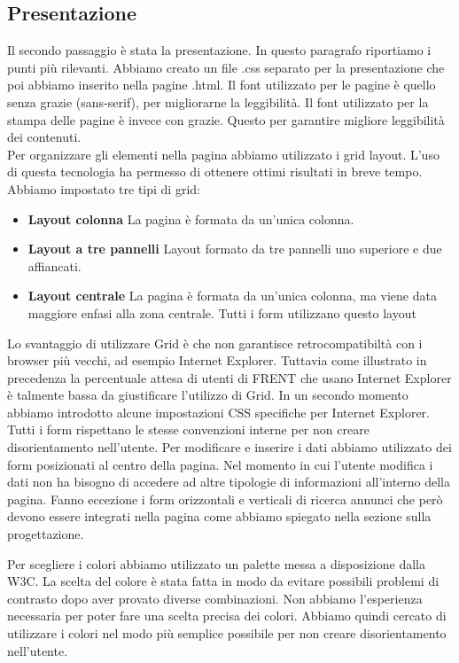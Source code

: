 \documentclass[1_relazione.tex]{subfiles}
\begin{document}
\subsection{Presentazione}
Il secondo passaggio \`{e} stata la presentazione. In questo paragrafo riportiamo i punti pi\`{u} rilevanti. Abbiamo creato un file .css separato per la presentazione che poi abbiamo inserito nella pagine .html. Il font utilizzato per le pagine \`{e} quello senza grazie (sans-serif), per migliorarne la leggibilit\`{a}. Il font utilizzato per la stampa delle pagine \`{e} invece con grazie. Questo per garantire migliore leggibilit\`{a} dei contenuti.  \\
Per organizzare gli elementi nella pagina abbiamo utilizzato i grid layout. L'uso di questa tecnologia ha permesso di ottenere ottimi risultati in breve tempo. Abbiamo impostato tre tipi di grid:
\begin{itemize}
\item \textbf{Layout colonna} La pagina è formata da un'unica colonna.
\item \textbf{Layout a tre pannelli} Layout formato da tre pannelli uno superiore e due affiancati.
\item \textbf{Layout centrale} La pagina è formata da un'unica colonna, ma viene data maggiore enfasi alla zona centrale. Tutti i form utilizzano questo layout
\end{itemize}

Lo svantaggio di utilizzare Grid \`{e} che non garantisce retrocompatibilt\`{a} con i browser pi\`{u} vecchi, ad esempio Internet Explorer. Tuttavia come illustrato in precedenza la percentuale attesa di utenti di FRENT che usano Internet Explorer \`{e} talmente bassa da giustificare l'utilizzo di Grid. In un secondo momento abbiamo introdotto alcune impostazioni CSS specifiche per Internet Explorer. \\
Tutti i form rispettano le stesse convenzioni interne per non creare disorientamento nell'utente. Per modificare e inserire i dati abbiamo utilizzato dei form posizionati al centro della pagina. Nel momento in cui l'utente modifica i dati non ha bisogno di accedere ad altre tipologie di informazioni all'interno della pagina. Fanno eccezione i form orizzontali e verticali di ricerca annunci che per\`{o} devono essere integrati nella pagina come abbiamo spiegato nella sezione sulla progettazione.

Per scegliere i colori abbiamo utilizzato un palette messa a disposizione dalla W3C. La scelta del colore \`{e} stata fatta in modo da evitare possibili problemi di contrasto dopo aver provato diverse combinazioni. Non abbiamo l'esperienza necessaria per poter fare una scelta precisa dei colori. Abbiamo quindi cercato di utilizzare i colori nel modo pi\`{u} semplice possibile per non creare disorientamento nell'utente.
\end{document}
